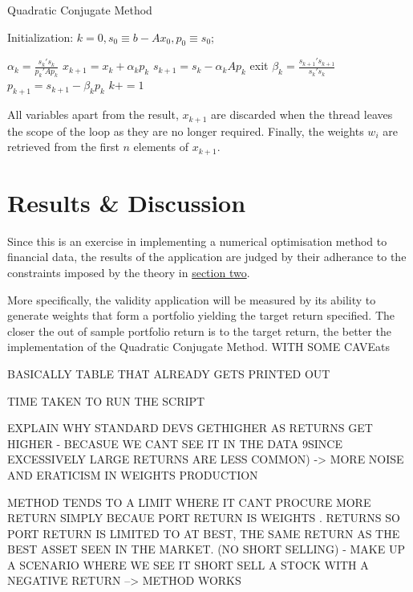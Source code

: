 \documentclass{article}
\begin{document}
\newpage 


\begin{algorithm}
	\caption{Quadratic Conjugate Method} 
	
	Initialization: $k=0, s_0 \equiv b - Ax_0, p_0 \equiv s_0$;
	
	\begin{algorithmic}[1]
		\State $\alpha_k = \frac{s_{k}'s_{k}}{p_{k}'Ap_{k}}$
		\State $x_{k+1} = x_{k} + 	\alpha_kp_{k}$
		\State $s_{k+1} = s_{k} - 	\alpha_kAp_{k}$
		\State exit
		\EndIf
		\State $\beta_k = \frac{s_{k+1}'s_{k+1}}{s_{k}'s_{k}}$
		\State $p_{k+1} = s_{k+1} - 	\beta_kp_{k}$
		\State $k+=1$
		\EndWhile
	\end{algorithmic} 
\end{algorithm}


All variables apart from the result, $x_{k+1}$ are discarded when the thread leaves the scope of the loop as they are no longer required. Finally, the weights $w_{i}$ are retrieved from the first $n$ elements of $x_{k+1}$. 


\section{Results \& Discussion}
\label{sec:results}

Since this is an exercise in implementing a numerical optimisation method to financial data, the results of the application are judged by their adherance to the constraints imposed by the theory in \hyperref[theory]{section two}.

More specifically, the validity application will be measured by its ability to generate weights that form a portfolio yielding the target return specified. The closer the out of sample portfolio return is to the target return, the better the implementation of the Quadratic Conjugate Method. WITH SOME CAVEats

BASICALLY TABLE THAT ALREADY GETS PRINTED OUT

TIME TAKEN TO RUN THE SCRIPT

EXPLAIN WHY STANDARD DEVS GETHIGHER AS RETURNS GET HIGHER - BECASUE WE CANT SEE IT IN THE DATA 9SINCE EXCESSIVELY LARGE RETURNS ARE LESS COMMON) -> MORE NOISE AND ERATICISM IN WEIGHTS PRODUCTION 

METHOD TENDS TO A LIMIT WHERE IT CANT PROCURE MORE RETURN SIMPLY BECAUE PORT RETURN IS WEIGHTS . RETURNS SO PORT RETURN IS LIMITED TO AT BEST, THE SAME RETURN AS THE BEST ASSET SEEN IN THE MARKET. (NO SHORT SELLING) - MAKE UP A SCENARIO WHERE WE SEE IT SHORT SELL A STOCK WITH A NEGATIVE RETURN --> METHOD WORKS
\end{document}
